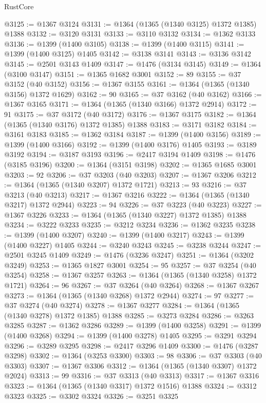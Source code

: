 \begin{lexlean}{RustCore}
\begin{coremodule}
@3125 := @1367 @3124
@3131 := @1364 (@1365 (@1340 @3125) @1372 @1385) @1388
@3132 := @3120 @3131
@3133 := @3110 @3132
@3134 := @1362 @3133
@3136 := @1399 (@1400 @3105)
@3138 := @1399 (@1400 @3115)
@3141 := @1399 (@1400 @3125) @1405
@3142 := @3138 @3141
@3143 := @3136 @3142
@3145 := @2501 @3143 @1409
@3147 := @1476 (@3134 @3145)
@3149 := @1364 (@3100 @3147)
@3151 := @1365 @1682 @3001
@3152 := 89
@3155 := @37 @3152 (@40 @3152)
@3156 := @1367 @3155
@3161 := @1364 (@1365 (@1340 @3156) @1372 @1629)
@3162 := 90
@3165 := @37 @3162 (@40 @3162)
@3166 := @1367 @3165
@3171 := @1364 (@1365 (@1340 @3166) @1372 @2914)
@3172 := 91
@3175 := @37 @3172 (@40 @3172)
@3176 := @1367 @3175
@3182 := @1364 (@1365 (@1340 @3176) @1372 @1385) @1388
@3183 := @3171 @3182
@3184 := @3161 @3183
@3185 := @1362 @3184
@3187 := @1399 (@1400 @3156)
@3189 := @1399 (@1400 @3166)
@3192 := @1399 (@1400 @3176) @1405
@3193 := @3189 @3192
@3194 := @3187 @3193
@3196 := @2417 @3194 @1409
@3198 := @1476 (@3185 @3196)
@3200 := @1364 (@3151 @3198)
@3202 := @1365 @1685 @3001
@3203 := 92
@3206 := @37 @3203 (@40 @3203)
@3207 := @1367 @3206
@3212 := @1364 (@1365 (@1340 @3207) @1372 @1721)
@3213 := 93
@3216 := @37 @3213 (@40 @3213)
@3217 := @1367 @3216
@3222 := @1364 (@1365 (@1340 @3217) @1372 @2944)
@3223 := 94
@3226 := @37 @3223 (@40 @3223)
@3227 := @1367 @3226
@3233 := @1364 (@1365 (@1340 @3227) @1372 @1385) @1388
@3234 := @3222 @3233
@3235 := @3212 @3234
@3236 := @1362 @3235
@3238 := @1399 (@1400 @3207)
@3240 := @1399 (@1400 @3217)
@3243 := @1399 (@1400 @3227) @1405
@3244 := @3240 @3243
@3245 := @3238 @3244
@3247 := @2501 @3245 @1409
@3249 := @1476 (@3236 @3247)
@3251 := @1364 (@3202 @3249)
@3253 := @1365 @1827 @3001
@3254 := 95
@3257 := @37 @3254 (@40 @3254)
@3258 := @1367 @3257
@3263 := @1364 (@1365 (@1340 @3258) @1372 @1721)
@3264 := 96
@3267 := @37 @3264 (@40 @3264)
@3268 := @1367 @3267
@3273 := @1364 (@1365 (@1340 @3268) @1372 @2944)
@3274 := 97
@3277 := @37 @3274 (@40 @3274)
@3278 := @1367 @3277
@3284 := @1364 (@1365 (@1340 @3278) @1372 @1385) @1388
@3285 := @3273 @3284
@3286 := @3263 @3285
@3287 := @1362 @3286
@3289 := @1399 (@1400 @3258)
@3291 := @1399 (@1400 @3268)
@3294 := @1399 (@1400 @3278) @1405
@3295 := @3291 @3294
@3296 := @3289 @3295
@3298 := @2417 @3296 @1409
@3300 := @1476 (@3287 @3298)
@3302 := @1364 (@3253 @3300)
@3303 := 98
@3306 := @37 @3303 (@40 @3303)
@3307 := @1367 @3306
@3312 := @1364 (@1365 (@1340 @3307) @1372 @2024)
@3313 := 99
@3316 := @37 @3313 (@40 @3313)
@3317 := @1367 @3316
@3323 := @1364 (@1365 (@1340 @3317) @1372 @1516) @1388
@3324 := @3312 @3323
@3325 := @3302 @3324
@3326 := @3251 @3325

\end{coremodule}
\end{lexlean}
